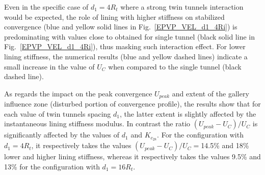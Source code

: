 \documentclass[a4paper,fleqn]{cas-sc}
\begin{document}
Even in the specific case of $d_1=4R_t$ where a strong twin tunnels interaction would be expected, the role of lining with higher stiffness on stabilized convergence (blue and yellow solid lines in Fig.~\ref{EPVP_VEL_d1_4Ri}) is predominating with values close to obtained for single tunnel (black solid line in Fig.~\ref{EPVP_VEL_d1_4Ri}), thus masking such interaction effect. For lower lining stiffness, the numerical results (blue and yellow dashed lines) indicate a small increase in the value of  $U_C$  when compared to the single tunnel (black dashed line).

As regards the impact on the peak convergence $U_{peak}$ and extent of the gallery influence zone (disturbed portion of convergence profile), the results show that for each value of twin tunnels spacing $d_1$, the latter extent is slightly affected by the instantaneous lining stiffness modulus. In contrast the ratio $(U_{peak}-U_C)/U_C$ is significantly affected by the values of $d_1$ and  $K_{c_{28}}$. For the configuration with $d_1=4R_t$, it respectively takes the values $(U_{peak}-U_C)/U_C=$14.5\% and 18\% lower and higher lining stiffness, whereas it respectively takes the values 9.5\% and 13\% for the configuration with $d_1=16R_t$. 
\end{document}
